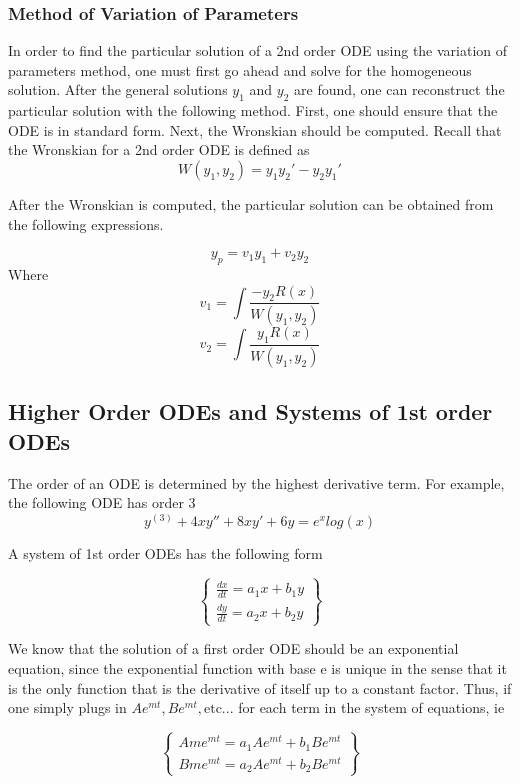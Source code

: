 \documentclass{article}
\begin{document}
\subsubsection{Method of Variation of Parameters}
In order to find the particular solution of a 2nd order ODE using the variation of parameters method, one must first go ahead and solve for the homogeneous solution. After the general solutions $y_1$ and $y_2$ are found, one can reconstruct the particular solution with the following method. First, one should ensure that the ODE is in standard form. Next, the Wronskian should be computed. Recall that the Wronskian for a 2nd order ODE is defined as $$W(y_1, y_2) = y_1y_2' - y_2y_1'$$

After the Wronskian is computed, the particular solution can be obtained from the following expressions. 

$$y_p = v_1y_1 + v_2y_2$$
Where
$$ v_1 = \int{\frac{-y_2R(x)}{W(y_1,y_2)}} $$
$$ v_2 = \int{\frac{y_1R(x)}{W(y_1,y_2)}} $$

\subsection{Higher Order ODEs and Systems of 1st order ODEs}

The order of an ODE is determined by the highest derivative term. For example, the following ODE has order 3
$$ y^{(3)} + 4xy'' + 8xy' + 6y = e^xlog(x)  $$ 

A system of 1st order ODEs has the following form 

$$ \begin{Bmatrix}
\frac{dx}{dt}= a_1x + b_1y\\
\frac{dy}{dt}= a_2x + b_2y
\end{Bmatrix}
$$ 

We know that the solution of a first order ODE should be an exponential equation, since the exponential function with base e is unique in the sense that it is the only function that is the derivative of itself up to a constant factor. Thus, if one simply plugs in $Ae^{mt}, Be^{mt}, \text{etc...}$ for each term in the system of equations, ie

$$ \begin{Bmatrix}
Ame^{mt}= a_1Ae^{mt} + b_1Be^{mt}\\
Bme^{mt}= a_2Ae^{mt} + b_2Be^{mt}
\end{Bmatrix}
$$
\end{document}
